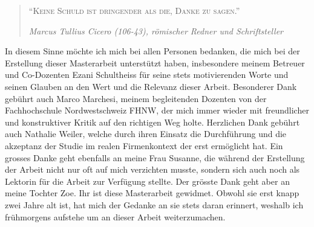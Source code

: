 \documentclass[../../main.tex]{subfiles}
\begin{document}
\begin{quote}
\textsc{"`Keine Schuld ist dringender als die, Danke zu sagen."'}

\footnotesize{\textit{Marcus Tullius Cicero (106-43), römischer Redner und Schriftsteller}}
\end{quote}

\begin{sloppypar}
In diesem Sinne möchte ich mich bei allen Personen bedanken, die mich bei der Erstellung dieser Masterarbeit unterstützt haben, insbesondere meinem Betreuer und Co-Dozenten Ezani Schultheiss für seine stets motivierenden Worte und seinen Glauben an den Wert und die Relevanz dieser Arbeit. Besonderer Dank gebührt auch Marco Marchesi, meinem begleitenden Dozenten von der Fachhochschule Nordwestschweiz FHNW, der mich immer wieder mit freundlicher und konstruktiver Kritik auf den richtigen Weg holte. Herzlichen Dank gebührt auch Nathalie Weiler, welche durch ihren Einsatz die Durchführung und die akzeptanz der Studie im realen Firmenkontext der \companyshort{} erst ermöglicht hat. Ein grosses Danke geht ebenfalls an meine Frau Susanne, die während der Erstellung der Arbeit nicht nur oft auf mich verzichten musste, sondern sich auch noch als Lektorin für die Arbeit zur Verfügung stellte. Der grösste Dank geht aber an meine Tochter Zoe. Ihr ist diese Masterarbeit gewidmet. Obwohl sie erst knapp zwei Jahre alt ist, hat mich der Gedanke an sie stets daran erinnert, weshalb ich frühmorgens aufstehe um an dieser Arbeit weiterzumachen.
\end{sloppypar}
\end{document}
